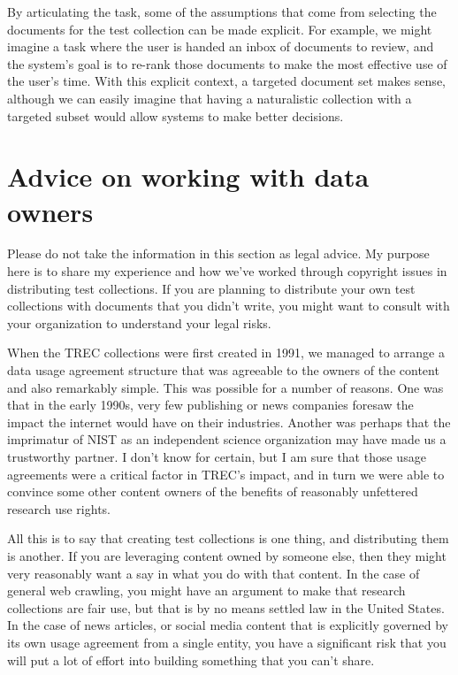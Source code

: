 \documentclass[nobib]{tufte-book}
\begin{document}
By articulating the task, some of the assumptions that come from selecting the documents for the test collection can be made explicit.  For example, we might imagine a task where the user is handed an inbox of documents to review, and the system's goal is to re-rank those documents to make the most effective use of the user's time.  With this explicit context, a targeted document set makes sense, although we can easily imagine that having a naturalistic collection with a targeted subset would allow systems to make better decisions.

\section{Advice on working with data owners}

Please do not take the information in this section as legal advice.  My purpose here is to share my experience and how we've worked through copyright issues in distributing test collections.  If you are planning to distribute your own test collections with documents that you didn't write, you might want to consult with your organization to understand your legal risks.

When the TREC collections were first created in 1991, we managed to arrange a data usage agreement structure that was agreeable to the owners of the content and also remarkably simple.  This was possible for a number of reasons.  One was that in the early 1990s, very few publishing or news companies foresaw the impact the internet would have on their industries.  Another was perhaps that the imprimatur of NIST as an independent science organization may have made us a trustworthy partner.  I don't know for certain, but I am sure that those usage agreements were a critical factor in TREC's impact, and in turn we were able to convince some other content owners of the benefits of reasonably unfettered research use rights.

All this is to say that creating test collections is one thing, and distributing them is another.  If you are leveraging content owned by someone else, then they might very reasonably want a say in what you do with that content.  In the case of general web crawling, you might have an argument to make that research collections are fair use, but that is by no means settled law in the United States.  In the case of news articles, or social media content that is explicitly governed by its own usage agreement from a single entity, you have a significant risk that you will put a lot of effort into building something that you can't share.
\end{document}
